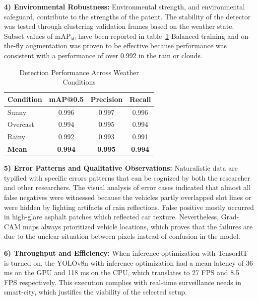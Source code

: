 \documentclass[conference]{IEEEtran}
\begin{document}
\vspace{0.3em}
\noindent\textbf{4) Environmental Robustness:}
Environmental strength, and environmental safeguard, contribute to the strengths of the patent.
The stability of the detector was tested through clustering validation frames based on the weather state. Subset values of mAP$_{50}$ have been reported in table~\ref{tab:weather_results} Balanced training and on-the-fly augmentation was proven to be effective because performance was consistent with a performance of over 0.992 in the rain or clouds.

\begin{table}[htbp]
\caption{Detection Performance Across Weather Conditions}
\begin{center}
\begin{tabular}{|l|c|c|c|}
\hline
\textbf{Condition} & \textbf{mAP@0.5} & \textbf{Precision} & \textbf{Recall} \\
\hline
Sunny & 0.996 & 0.997 & 0.996 \\
Overcast & 0.994 & 0.995 & 0.994 \\
Rainy & 0.992 & 0.993 & 0.991 \\
\hline
\textbf{Mean} & \textbf{0.994} & \textbf{0.995} & \textbf{0.994} \\
\hline
\end{tabular}
\label{tab:weather_results}
\end{center}
\end{table}

\vspace{0.3em}
\noindent\textbf{5) Error Patterns and Qualitative Observations:}
Naturalistic data are typified with specific errors patterns that can be cognized by both the researcher and other researchers. The visual analysis of error cases indicated that almost all false negatives were witnessed because the vehicles partly overlapped slot lines or were hidden by lighting artifacts of rain reflections. False positive mostly occurred in high-glare asphalt patches which reflected car texture. Nevertheless, Grad-CAM maps always prioritized vehicle locations, which proves that the failures are due to the unclear situation between pixels instead of confusion in the model.

\vspace{0.3em}
\noindent\textbf{6) Throughput and Efficiency:}
When inference optimization with TensorRT is turned on, the YOLOv8n with inference optimization had a mean latency of 36 ms on the GPU and 118 ms on the CPU, which translates to 27 FPS and 8.5 FPS respectively. This execution complies with real-time surveillance needs in smart-city, which justifies the viability of the selected setup.
\end{document}
